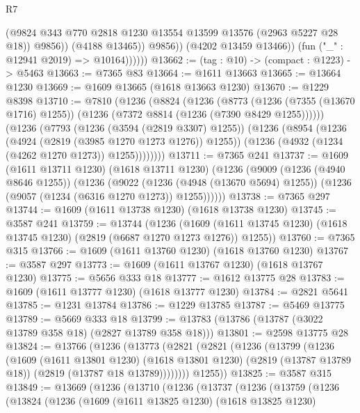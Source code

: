 \begin{lexlean}{R7}
\begin{coremodule}
                          (@9824 @343 @770 @2818 @1230 @13554 @13599 @13576 (@2963 @5227 @28 @18))
                          @9856))
                      (@4188 @13465))
                    @9856))
                (@4202 @13459 @13466))
              (fun ("_" : @12941 @2019) => @10164))))))
@13662 := (tag : @10) -> (compact : @1223) -> @5463
@13663 := @7365 @83
@13664 := @1611 @13663
@13665 := @13664 @1230
@13669 := @1609 @13665 (@1618 @13663 @1230)
@13670 := @1229 @8398
@13710 := @7810
    (@1236
      (@8824
        (@1236
          (@8773
            (@1236 (@7355 (@13670 @1716) @1255))
            (@1236 (@7372 @8814 (@1236 (@7390 @8429 @1255))))))
        (@1236
          (@7793
            (@1236 (@3594 (@2819 @3307) @1255))
            (@1236
              (@8954
                (@1236 (@4924 (@2819 (@3985 @1270 @1273 @1276)) @1255))
                (@1236 (@4932 (@1234 (@4262 @1270 @1273)) @1255))))))))
@13711 := @7365 @241
@13737 := @1609
    (@1611 @13711 @1230)
    (@1618 @13711 @1230)
    (@1236
      (@9009
        (@1236 (@4940 @8646 @1255))
        (@1236
          (@9022
            (@1236 (@4948 (@13670 @5694) @1255))
            (@1236 (@9057 (@1234 (@6316 @1270 @1273)) @1255))))))
@13738 := @7365 @297
@13744 := @1609 (@1611 @13738 @1230) (@1618 @13738 @1230)
@13745 := @3587 @241
@13759 := @13744
    (@1236
      (@1609 (@1611 @13745 @1230) (@1618 @13745 @1230) (@2819 (@6687 @1270 @1273 @1276)) @1255))
@13760 := @7365 @315
@13766 := @1609 (@1611 @13760 @1230) (@1618 @13760 @1230)
@13767 := @3587 @297
@13773 := @1609 (@1611 @13767 @1230) (@1618 @13767 @1230)
@13775 := @5656 @333 @18
@13777 := @1612 @13775 @28
@13783 := @1609 (@1611 @13777 @1230) (@1618 @13777 @1230)
@13784 := @2821 @5641
@13785 := @1231 @13784
@13786 := @1229 @13785
@13787 := @5469 @13775
@13789 := @5669 @333 @18
@13799 := @13783 (@13786 (@13787 (@3022 @13789 @358 @18) (@2827 @13789 @358 @18)))
@13801 := @2598 @13775 @28
@13824 := @13766
    (@1236
      (@13773
        (@2821
          (@2821
            (@1236
              (@13799
                (@1236
                  (@1609
                    (@1611 @13801 @1230)
                    (@1618 @13801 @1230)
                    (@2819 (@13787 @13789 @18))
                    (@2819 (@13787 @18 @13789))))))))
        @1255))
@13825 := @3587 @315
@13849 := @13669
    (@1236
      (@13710
        (@1236
          (@13737
            (@1236
              (@13759
                (@1236
                  (@13824
                    (@1236
                      (@1609
                        (@1611 @13825 @1230)
                        (@1618 @13825 @1230)

\end{coremodule}
\end{lexlean}
